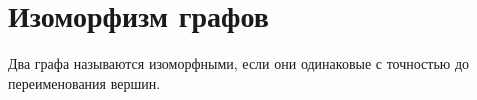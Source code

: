 \section{Изоморфизм графов}
Два графа называются изоморфными, если они одинаковые с точностью до переименования вершин.